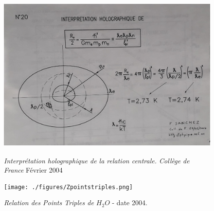 \documentclass[a4paper,12pt]{article}
\begin{document}
\begin{appendix}
\begin{figure}
\centering
\includegraphics[width=14.5cm,height=8.6cm]{./figures/Holotemperature.jpg}
\caption[Interprétation holographique de la relation centrale. Collège de France]{\textit{Interprétation holographique de la relation centrale. Collège de France} Février 2004}
\label{fig:20:figure20}
\end{figure}

\begin{figure}
\centering
\texttt{[image: ./figures/Zpointstriples.png]}
\caption[Relation des Points Triples de l'eau]{\textit{Relation des Points Triples de $H_2O$} - date  2004.} 
\label{fig:21:figure21}
\end{figure}





\end{appendix}
\end{document}
